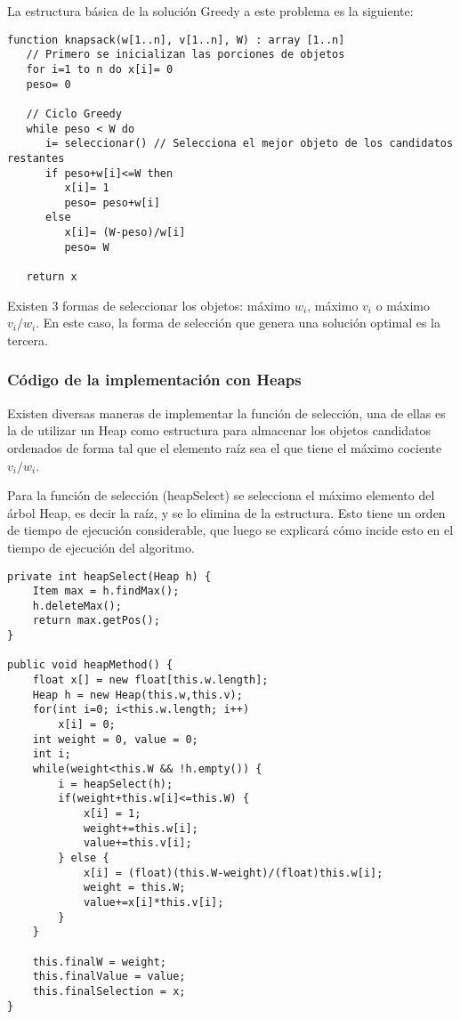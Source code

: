\documentclass[a4paper,10pt,spanish]{article}
\begin{document}
	La estructura b\'asica de la soluci\'on Greedy a este problema es la siguiente:
	\begin{verbatim}
function knapsack(w[1..n], v[1..n], W) : array [1..n]
   // Primero se inicializan las porciones de objetos
   for i=1 to n do x[i]= 0
   peso= 0
   
   // Ciclo Greedy
   while peso < W do
      i= seleccionar() // Selecciona el mejor objeto de los candidatos restantes
      if peso+w[i]<=W then 
         x[i]= 1
         peso= peso+w[i]
      else
         x[i]= (W-peso)/w[i]
         peso= W

   return x
	\end{verbatim}
	
	Existen 3 formas de seleccionar los objetos: m\'aximo $w_i$, m\'aximo $v_i$ o m\'aximo $v_i/w_i$. En este caso, la forma de selecci\'on que genera una soluci\'on optimal es la tercera.
	
	\subsubsection{C\'odigo de la implementaci\'on con Heaps}
	Existen diversas maneras de implementar la funci\'on de selecci\'on, una de ellas es la de utilizar un Heap como estructura para almacenar los objetos candidatos ordenados de forma tal que el elemento ra\'iz sea el que tiene el m\'aximo cociente $v_i/w_i$.
	
	Para la funci\'on de selecci\'on (heapSelect) se selecciona el m\'aximo elemento del \'arbol Heap, es decir la ra\'iz, y se lo elimina de la estructura. Esto tiene un orden de tiempo de ejecuci\'on considerable, que luego se explicar\'a c\'omo incide esto en el tiempo de ejecuci\'on del algoritmo.
	
	\label{gre1}
		\begin{lstlisting}
private int heapSelect(Heap h) {
	Item max = h.findMax();
	h.deleteMax();
	return max.getPos();
}
	
public void heapMethod() {
	float x[] = new float[this.w.length];
	Heap h = new Heap(this.w,this.v);
	for(int i=0; i<this.w.length; i++)
		x[i] = 0;
	int weight = 0, value = 0;
	int i;
	while(weight<this.W && !h.empty()) {
		i = heapSelect(h);
		if(weight+this.w[i]<=this.W) {
			x[i] = 1;
			weight+=this.w[i];
			value+=this.v[i];
		} else {
			x[i] = (float)(this.W-weight)/(float)this.w[i];
			weight = this.W;
			value+=x[i]*this.v[i];
		}
	}
	
	this.finalW = weight;
	this.finalValue = value;
	this.finalSelection = x;
}
		\end{lstlisting}
	
\end{document}
